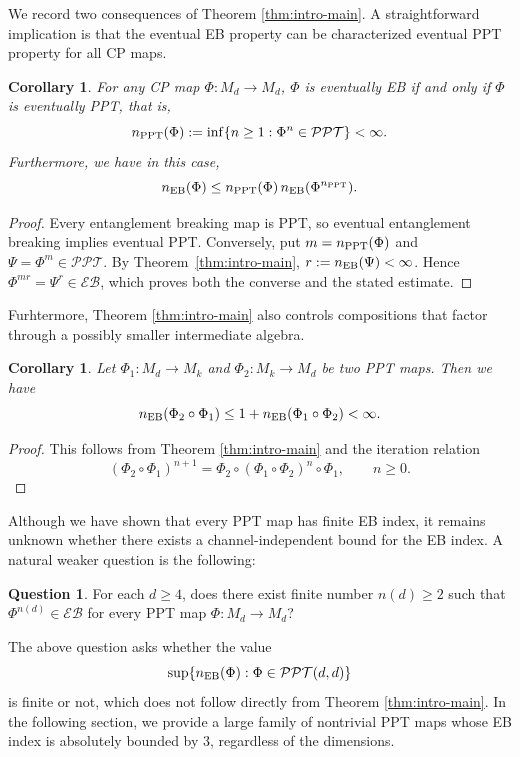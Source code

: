 \documentclass[11pt,reqno]{amsart}
\newtheorem{corollary}[theorem]{Corollary}
\theoremstyle{definition}
\theoremstyle{definition}
\theoremstyle{definition}
\theoremstyle{definition}
\newtheorem{question}
[theorem]{Question}
\newcommand{\EB}{\mathcal{EB}}
\newcommand{\PPT}{\mathcal{PPT}}
\begin{document}
We record two consequences of Theorem \ref{thm:intro-main}. A straightforward implication is that the eventual EB property can be characterized eventual PPT property for all CP maps.

\begin{corollary} \label{cor:PPTInd}
For any CP map $\Phi:M_d\to M_d$, $\Phi$ is eventually EB if and only if $\Phi$ is eventually PPT, that is,
    $$n_{\rm PPT}(\Phi):=\inf \{n\geq 1: \Phi^n\in \PPT\}<\infty.$$
Furthermore, we have in this case,
    $$n_{\rm EB}(\Phi) \leq n_{\rm PPT}(\Phi)\, n_{\rm EB}(\Phi^{n_{\rm PPT}}).$$
\end{corollary}
\begin{proof}
Every entanglement breaking map is PPT, so eventual entanglement breaking implies eventual PPT. Conversely, put $m=n_{\rm PPT}(\Phi)$ and $\Psi=\Phi^m\in \PPT$. By Theorem~\ref{thm:intro-main}, $r:=n_{\rm EB}(\Psi)<\infty$. Hence $\Phi^{mr}=\Psi^r\in\EB$, which proves both the converse and the stated estimate.
\end{proof}

Furhtermore, Theorem \ref{thm:intro-main} also controls compositions that factor through a
possibly smaller intermediate algebra.

\begin{corollary}
\label{cor:rectangular-eventual}
Let $\Phi_1:M_d\to M_k$ and $\Phi_2:M_k\to M_d$
be two PPT maps. Then we have
    $$n_{\rm EB}(\Phi_2\circ \Phi_1)\leq 1+ n_{\rm EB}(\Phi_1\circ \Phi_2)<\infty.$$
\end{corollary}
\begin{proof}
This follows from Theorem \ref{thm:intro-main} and the iteration relation
    $$(\Phi_2\circ \Phi_1)^{n+1}=\Phi_2\circ (\Phi_1\circ \Phi_2)^n\circ \Phi_1, \qquad n\geq 0.$$
\end{proof}

Although we have shown that every PPT map has finite EB index, it remains unknown whether there exists a channel-independent bound for the EB index. A natural weaker question is the following:

\begin{question}
For each $d\geq 4$, does there exist finite number $n(d)\geq 2$ such that $\Phi^{n(d)}\in \EB$ for every PPT map $\Phi:M_d\to M_d$?
\end{question}

The above question asks whether the value
    $$\sup\{n_{\rm EB}(\Phi):\Phi\in \PPT(d,d)\}$$
is finite or not, which does not follow directly from Theorem \ref{thm:intro-main}. In the following section, we provide a large family of nontrivial PPT maps whose EB index is absolutely bounded by $3$, regardless of the dimensions.
\end{document}
